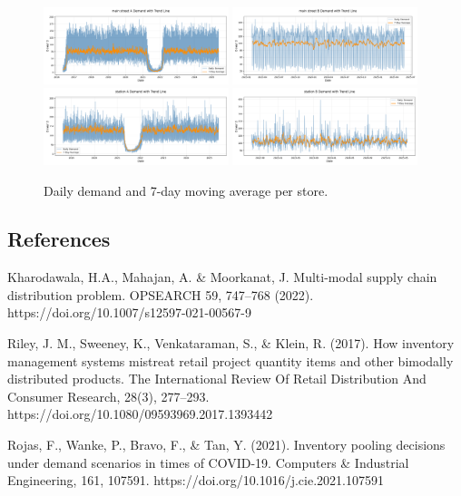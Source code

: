 \documentclass{article}
\begin{document}
\begin{figure}[H]
    \centering
    \includegraphics[width=0.48\textwidth]{figures/store_trend_main_street_A.png}
    \includegraphics[width=0.48\textwidth]{figures/store_trend_main_street_B.png}
    \includegraphics[width=0.48\textwidth]{figures/store_trend_station_A.png}
    \includegraphics[width=0.48\textwidth]{figures/store_trend_station_B.png}
    \caption{Daily demand and 7-day moving average per store.}
    \label{fig:trend_lines}
\end{figure}

\subsection*{References}

    Kharodawala, H.A., Mahajan, A. \& Moorkanat, J. Multi-modal supply chain distribution problem. OPSEARCH 59, 747–768 (2022). https://doi.org/10.1007/s12597-021-00567-9 

    Riley, J. M., Sweeney, K., Venkataraman, S., \& Klein, R. (2017). How inventory management systems mistreat retail project quantity items and other bimodally distributed products. The International Review Of Retail Distribution And Consumer Research, 28(3), 277–293. https://doi.org/10.1080/09593969.2017.1393442

    Rojas, F., Wanke, P., Bravo, F., \& Tan, Y. (2021). Inventory pooling decisions under demand scenarios in times of COVID-19. Computers \& Industrial Engineering, 161, 107591. https://doi.org/10.1016/j.cie.2021.107591
\end{document}
